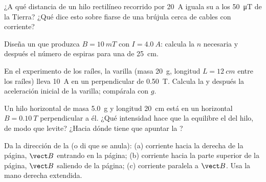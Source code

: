 \begin{exercise}[$\star\star$]\label{exo:g11:magnetic-fields:7}
¿A qué distancia de un hilo rectilíneo recorrido por \qty{20}{A} iguala
su  a los \qty{50}{\micro T} de la Tierra? ¿Qué dice esto sobre
fiarse de una brújula cerca de cables con corriente?
\end{exercise}

\begin{exercise}[$\star\star$]\label{exo:g11:magnetic-fields:8}
Diseña un  que produzca $B = \qty{10}{mT}$ con
$I = \qty{4.0}{A}$: calcula la $n$ necesaria y después el número de
espiras para una  de \qty{25}{cm}.
\end{exercise}

\begin{exercise}[$\star\star$]\label{exo:g11:magnetic-fields:9}
En el experimento de los raíles, la varilla (masa \qty{20}{g}, longitud
$L = \qty{12}{cm}$ entre los raíles) lleva \qty{10}{A} en un 
perpendicular de \qty{0.50}{T}. Calcula la  y después
la aceleración inicial de la varilla; compárala con $g$.
\end{exercise}

\begin{exercise}[$\star\star$]\label{exo:g11:magnetic-fields:10}
Un hilo horizontal de masa \qty{5.0}{g} y longitud \qty{20}{cm} está en
un  horizontal $B = \qty{0.10}{T}$ perpendicular a él. ¿Qué
intensidad hace que la  equilibre el  del hilo, de
modo que levite? ¿Hacia dónde tiene que apuntar la ?
\end{exercise}

\begin{exercise}[$\star\star$]\label{exo:g11:magnetic-fields:11}
Da la dirección de la  (o di que se anula): (a)
corriente hacia la derecha de la página, $\vect B$ entrando en la
página; (b) corriente hacia la parte superior de la página, $\vect B$
saliendo de la página; (c) corriente paralela a $\vect B$. Usa la mano
derecha extendida.
\end{exercise}

